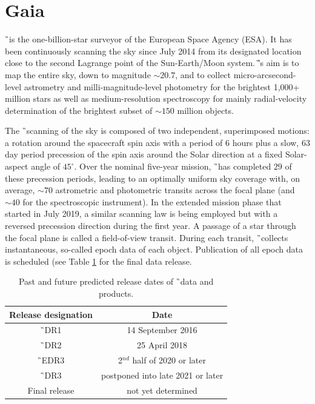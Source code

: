 \section{Gaia}
\label{sec:gaia_data}
\G\ is the one-billion-star surveyor of the European Space Agency (ESA). It has been continuously scanning the sky since July 2014 from its designated location close to the second Lagrange point of the Sun-Earth/Moon system. \G’s aim is to map the entire sky, down to magnitude $\sim20.7$, and to collect micro-arcsecond-level astrometry and milli-magnitude-level photometry for the brightest 1,000+ million stars as well as medium-resolution spectroscopy for mainly radial-velocity determination of the brightest subset of $\sim150$ million objects. 

The \G\ scanning of the sky is composed of two independent, superimposed motions: a rotation around the spacecraft spin axis with a period of 6 hours plus a slow, 63 day period precession of the spin axis around the Solar direction at a fixed Solar-aspect angle of $45^\circ$. Over the nominal five-year mission, \G\ has completed $29$ of these precession periods, leading to an optimally uniform sky coverage with, on average, $\sim70$ astrometric and photometric transits across the focal plane (and $\sim40$ for the spectroscopic instrument). In the extended mission phase that started in July 2019, a similar scanning law is being employed but with a reversed precession direction during the first year. A passage of a star through the focal plane is called a field-of-view transit. During each transit, \G\ collects instantaneous, so-called epoch data of each object. Publication of all epoch data is scheduled (see Table \ref{tab:gaia_drs} for the final data release.

\begin{table}
	\centering
	\caption{Past and future predicted release dates of \G\ data and products.}
	\begin{tabular}{c c}
		\hline
		Release designation & Date \\ 
		\hline
		\G\ DR1 & 14 September 2016 \\
		\G\ DR2 & 25 April 2018 \\
		\G\ EDR3 & 2$^{nd}$ half of 2020 or later \\
		\G\ DR3 & postponed into late 2021 or later \\
		Final release & not yet determined \\
		\hline
	\end{tabular}
	\label{tab:gaia_drs}
\end{table}


